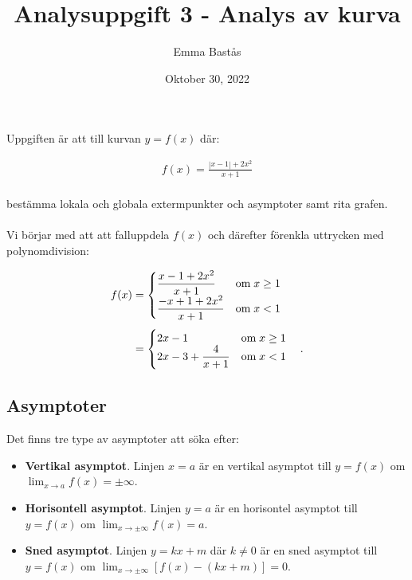 \documentclass{article}
\title{Analysuppgift 3 - Analys av kurva}
\author{Emma Bastås}
\date{Oktober 30, 2022}
\begin{document}
\maketitle

\noindent Uppgiften är att till kurvan $y = f(x)$ där:

\begin{gather*}
  f(x) = \frac{|x-1| + 2x^{2}}{x + 1}
\end{gather*}
\\
bestämma lokala och globala extermpunkter och asymptoter samt rita grafen.
\\
\\
Vi börjar med att att falluppdela $f(x)$ och därefter förenkla uttrycken med polynomdivision:

\begin{align}
  f(x) &=
         \begin{cases}
           \begin{aligned}[t]
             & \frac{x - 1 + 2x^{2}}{x+1} & \text{om} \; x \geq 1 \\
             & \frac{-x + 1 +2x^{2}}{x+1} & \text{om} \; x < 1
           \end{aligned}
         \end{cases} \notag \\[4pt]
       & =
         \begin{cases}
           \begin{aligned}[t]
             & 2x - 1 & \text{om} \; x \geq 1 \\
             & 2x - 3 + \frac{4}{x + 1} & \text{om} \; x < 1
          \end{aligned}
         \end{cases}\text{.} \label{cases}
\end{align}


\subsection*{Asymptoter}

Det finns tre type av asymptoter att söka efter:

\begin{itemize}
        \item \textbf{Vertikal asymptot}. Linjen $x = a$ är en vertikal asymptot till $y = f(x)$ om $\lim_{x \to a}f(x) = \pm\infty$.
        \item \textbf{Horisontell asymptot}. Linjen $y = a$ är en horisontel asymptot till $y = f(x)$ om $\lim_{x \to \pm\infty}f(x) = a$.
        \item \textbf{Sned asymptot}. Linjen $y = kx + m$ där $k \neq 0$ är en sned asymptot till $y = f(x)$ om $\lim_{x \to \pm\infty}[f(x) - (kx +m)] = 0$.
\end{itemize}
\end{document}
